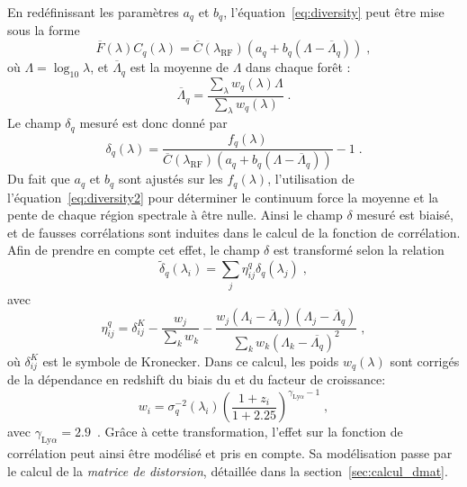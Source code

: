 En redéfinissant les paramètres $a_q$ et $b_q$, l'équation~\ref{eq:diversity} peut être mise sous la forme
\begin{equation}
  \label{eq:diversity2}
  \overline F(\lambda) C_q(\lambda) = \overline C(\lambda_{\mathrm{RF}})(a_q + b_q (\Lambda - \overline \Lambda_q))  \; ,
\end{equation}
où $\Lambda = \log_{10} \lambda$, et $\overline \Lambda_q$ est la moyenne de $\Lambda$ dans chaque forêt :
\begin{equation}
  \label{eq:lambda_mean}
  \overline \Lambda_q = \frac{\sum\limits_{\lambda} w_q(\lambda) \Lambda}{\sum\limits_{\lambda} w_q(\lambda)}  \; .
\end{equation}
Le champ $ \delta_q$ mesuré est donc donné par
\begin{equation}
  \label{eq:deltaF2}
   \delta_q(\lambda) = \frac{f_q(\lambda)}{\overline C(\lambda_{\mathrm{RF}})(a_q + b_q (\Lambda - \overline \Lambda_q))} - 1  \; .
\end{equation}
Du fait que $a_q$ et $b_q$ sont ajustés sur les $f_q(\lambda)$, l'utilisation de l'équation~\ref{eq:diversity2} pour déterminer le continuum force la moyenne et la pente de chaque région spectrale à être nulle. Ainsi le champ $\delta$ mesuré est biaisé, et de fausses corrélations sont induites dans le calcul de la fonction de corrélation.
Afin de prendre en compte cet effet, le champ $\delta$ est transformé selon la relation
\begin{equation}
  \label{eq:deltaF3}
  \tilde \delta_q(\lambda_i) = \sum\limits_j \eta_{ij}^q \delta_q(\lambda_j)  \; ,
\end{equation}
avec
\begin{equation}
  \eta^q_{ij}
  =
  \delta^K_{ij}
  - \frac{
    w_{j}
  }{
    \sum\limits_{k} w_{k}
  }
  -
  \frac{
    w_{j} \left( \Lambda_{i}-\overline \Lambda_{q} \right) \left(\Lambda_j-\overline \Lambda_{q} \right)
  }{
    \sum\limits_{k} w_{k} \left( \Lambda_{k}-\overline {\Lambda_{q}} \right)^{2}
  }
  \; ,
  \label{eq:proj1}
\end{equation}
où $\delta^K_{ij}$ est le symbole de Kronecker.
Dans ce calcul, les poids $w_q(\lambda)$ sont corrigés de la dépendance en redshift du biais du \lya{} et du facteur de croissance:
\begin{equation}
  \label{eq:weights2}
  w_{i}
  =
  \sigma_q^{-2}(\lambda_i)
  \left( \frac{1+z_{i}}{1+2.25} \right)^{\gamma_{\mathrm{Ly}\alpha} -1} \;,
\end{equation}
avec $\gamma_{\mathrm{Ly}\alpha} = 2.9$~\autocite{McDonald2004}.
Grâce à cette transformation, l'effet sur la fonction de corrélation peut ainsi être modélisé et pris en compte. Sa modélisation passe par le calcul de la \emph{matrice de distorsion}, détaillée dans la section~\ref{sec:calcul_dmat}.

